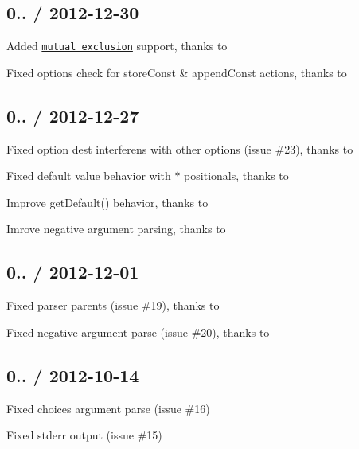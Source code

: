 \subsection*{0.. / 2012-\/12-\/30 }


\begin{DoxyItemize}
\item Added \href{http://docs.python.org/dev/library/argparse.html#mutual-exclusion}{\tt mutual exclusion} support, thanks to 
\item Fixed options check for {\ttfamily store\+Const} \& {\ttfamily append\+Const} actions, thanks to 
\end{DoxyItemize}

\subsection*{0.. / 2012-\/12-\/27 }


\begin{DoxyItemize}
\item Fixed option dest interferens with other options (issue \#23), thanks to 
\item Fixed default value behavior with {\ttfamily $\ast$} positionals, thanks to 
\item Improve {\ttfamily get\+Default()} behavior, thanks to 
\item Imrove negative argument parsing, thanks to 
\end{DoxyItemize}

\subsection*{0.. / 2012-\/12-\/01 }


\begin{DoxyItemize}
\item Fixed parser parents (issue \#19), thanks to 
\item Fixed negative argument parse (issue \#20), thanks to 
\end{DoxyItemize}

\subsection*{0.. / 2012-\/10-\/14 }


\begin{DoxyItemize}
\item Fixed \textquotesingle{}choices\textquotesingle{} argument parse (issue \#16)
\item Fixed stderr output (issue \#15)
\end{DoxyItemize}

